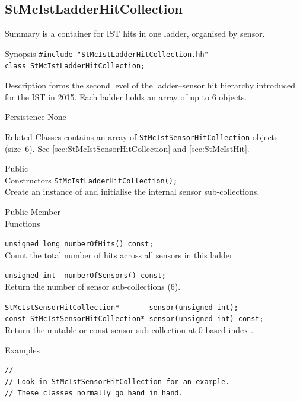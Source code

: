 \subsection{StMcIstLadderHitCollection}
 
\label{sec:StMcIstLadderHitCollection}
\begin{Entry}
\item[Summary]
     is a container for IST hits in one
    ladder, organised by sensor.

\item[Synopsis]
    \verb+#include "StMcIstLadderHitCollection.hh"+\\
    \verb+class StMcIstLadderHitCollection;+\\

\item[Description]
     forms the second level of the
    ladder--sensor hit hierarchy introduced for the IST in 2015.  Each
    ladder holds an array of up to 6
     objects.

\item[Persistence]
    None

\item[Related Classes]
     contains an array of
    {\tt StMcIstSensorHitCollection} objects (size~6).  See
     \ref{sec:StMcIstSensorHitCollection}
    and  \ref{sec:StMcIstHit}.

\item[Public\\ Constructors]
    \verb+StMcIstLadderHitCollection();+\\
    Create an instance of  and
    initialise the internal sensor sub-collections.

\item[Public Member\\ Functions]

    \verb+unsigned long numberOfHits() const;+\\
    Count the total number of hits across all sensors in this ladder.

    \verb+unsigned int  numberOfSensors() const;+\\
    Return the number of sensor sub-collections (6).

    \verb+StMcIstSensorHitCollection*       sensor(unsigned int);+\\
    \verb+const StMcIstSensorHitCollection* sensor(unsigned int) const;+\\
    Return the mutable or const sensor sub-collection at 0-based index
    .

\item[Examples]
{\footnotesize
\begin{verbatim}
//
// Look in StMcIstSensorHitCollection for an example.
// These classes normally go hand in hand.
\end{verbatim}
}%
\end{Entry}
\clearpage


